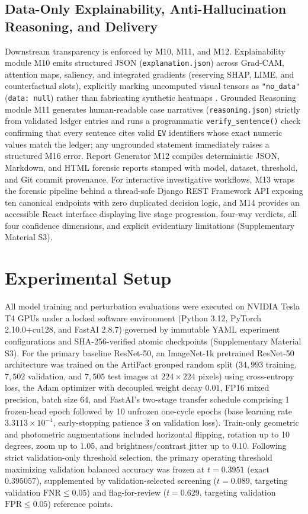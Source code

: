 \documentclass[final,5p,times,twocolumn,numafflabel]{elsarticle}
\begin{document}
\subsection{Data-Only Explainability, Anti-Hallucination Reasoning, and Delivery}
\label{subsec:explain}

Downstream transparency is enforced by M10, M11, and M12. Explainability module M10 emits structured JSON (\texttt{explanation.json}) across Grad-CAM, attention maps, saliency, and integrated gradients (reserving SHAP, LIME, and counterfactual slots), explicitly marking uncomputed visual tensors as \texttt{"no\_data"} (\texttt{data: null}) rather than fabricating synthetic heatmaps \cite{Altamimi_2026}. Grounded Reasoning module M11 generates human-readable case narratives (\texttt{reasoning.json}) strictly from validated ledger entries and runs a programmatic \texttt{verify\_sentence()} check confirming that every sentence cites valid \texttt{EV} identifiers whose exact numeric values match the ledger; any ungrounded statement immediately raises a structured M16 error. Report Generator M12 compiles deterministic JSON, Markdown, and HTML forensic reports stamped with model, dataset, threshold, and Git commit provenance. For interactive investigative workflows, M13 wraps the forensic pipeline behind a thread-safe Django REST Framework API exposing ten canonical endpoints with zero duplicated decision logic, and M14 provides an accessible React interface displaying live stage progression, four-way verdicts, all four confidence dimensions, and explicit evidentiary limitations (Supplementary Material S3).

\section{Experimental Setup}
\label{sec:setup}

All model training and perturbation evaluations were executed on NVIDIA Tesla T4 GPUs under a locked software environment (Python 3.12, PyTorch 2.10.0+cu128, and FastAI 2.8.7) governed by immutable YAML experiment configurations and SHA-256-verified atomic checkpoints (Supplementary Material S3). For the primary baseline ResNet-50, an ImageNet-1k pretrained ResNet-50 architecture was trained on the ArtiFact grouped random split ($34{,}993$ training, $7{,}502$ validation, and $7{,}505$ test images at $224\times 224$ pixels) using cross-entropy loss, the Adam optimizer with decoupled weight decay $0.01$, FP16 mixed precision, batch size 64, and FastAI's two-stage transfer schedule comprising 1 frozen-head epoch followed by 10 unfrozen one-cycle epochs (base learning rate $3.3113\times 10^{-4}$, early-stopping patience 3 on validation loss). Train-only geometric and photometric augmentations included horizontal flipping, rotation up to 10 degrees, zoom up to $1.05$, and brightness/contrast jitter up to $0.10$. Following strict validation-only threshold selection, the primary operating threshold maximizing validation balanced accuracy was frozen at $t = 0.3951$ (exact $0.395057$), supplemented by validation-selected screening ($t = 0.089$, targeting validation $\text{FNR} \le 0.05$) and flag-for-review ($t = 0.629$, targeting validation $\text{FPR} \le 0.05$) reference points.
\end{document}
